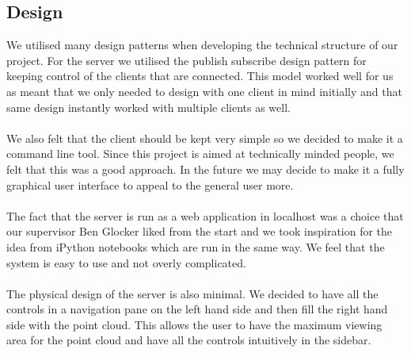 \documentclass{article}
\begin{document}
\subsection{Design}
We utilised many design patterns when developing the technical structure of our project. For the server we utilised the publish subscribe design pattern for keeping control of the clients that are connected. This model worked well for us as meant that we only needed to design with one client in mind initially and that same design instantly worked with multiple clients as well.
\\\\
We also felt that the client should be kept very simple so we decided to make it a command line tool. Since this project is aimed at technically minded people, we felt that this was a good approach. In the future we may decide to make it a fully graphical user interface to appeal to the general user more.
\\\\
The fact that the server is run as a web application in localhost was a choice that our supervisor Ben Glocker liked from the start and we took inspiration for the idea from iPython notebooks which are run in the same way. We feel that the system is easy to use and not overly complicated.
\\\\
The physical design of the server is also minimal. We decided to have all the controls in a navigation pane on the left hand side and then fill the right hand side with the point cloud. This allows the user to have the maximum viewing area for the point cloud and have all the controls intuitively in the sidebar.
\end{document}
